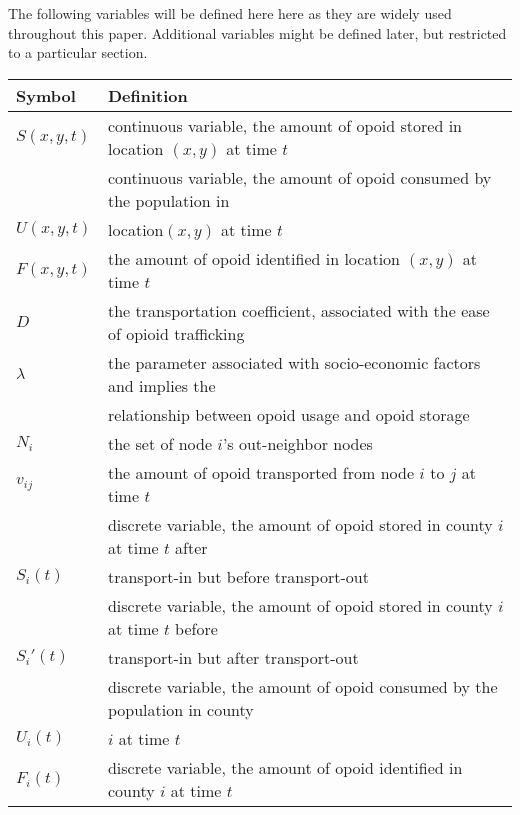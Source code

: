 The following variables will be defined here here as they are widely used throughout this paper. Additional variables might be defined later, but restricted to a particular section.

\begin{table}[H]
\centering
\begin{tabular}{|l|l|}
\hline
\rowcolor[HTML]{656565} 
{\color[HTML]{FFFFFF} \textbf{Symbol}} & {\color[HTML]{FFFFFF} \textbf{Definition}} \\ \hline
$S(x,y,t)$& continuous variable, the amount of opoid stored in location $(x,y)$ at time $t$ \\ \hline
 & continuous variable, the amount of opoid consumed by the population in \\$U(x,y,t)$ &location$(x,y)$ at time $t$  \\ \hline
$F(x,y,t)$& the amount of opoid identified in location $(x,y)$ at time $t$ \\ \hline
$D$ & the transportation coefficient, associated with the ease of opioid trafficking  \\ \hline
$\lambda$ & the parameter associated with socio-economic factors and implies the \\ & relationship between opoid usage and opoid storage  \\ \hline
$N_i$ & the set of node $i$'s out-neighbor nodes \\ \hline
$v_{ij}$ & the amount of opoid transported from node $i$ to $j$ at time $t$ \\ \hline
 & discrete variable, the amount of opoid stored in county $i$ at time $t$ after\\$S_i(t)$& transport-in but before transport-out \\ \hline
 & discrete variable, the amount of opoid stored in county $i$ at time $t$ before\\$S_i'(t)$& transport-in but after transport-out \\ \hline 
 & discrete variable, the amount of opoid consumed by the population in county\\$U_i(t)$& $i$ at time $t$ \\ \hline
$F_i(t)$ & discrete variable, the amount of opoid identified in county $i$ at time $t$ \\ \hline

\end{tabular}
\end{table}
